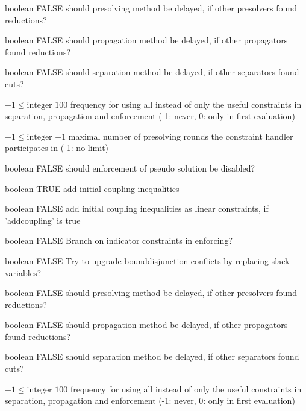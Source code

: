 %
{boolean}%
{FALSE}%
{should presolving method be delayed, if other presolvers found reductions?}%
{}

%
{boolean}%
{FALSE}%
{should propagation method be delayed, if other propagators found reductions?}%
{}

%
{boolean}%
{FALSE}%
{should separation method be delayed, if other separators found cuts?}%
{}

%
{$-1\leq\textrm{integer}$}%
{$100$}%
{frequency for using all instead of only the useful constraints in separation, propagation and enforcement (-1: never, 0: only in first evaluation)}%
{}

%
{$-1\leq\textrm{integer}$}%
{$-1$}%
{maximal number of presolving rounds the constraint handler participates in (-1: no limit)}%
{}

%
{boolean}%
{FALSE}%
{should enforcement of pseudo solution be disabled?}%
{}

%
{boolean}%
{TRUE}%
{add initial coupling inequalities}%
{}

%
{boolean}%
{FALSE}%
{add initial coupling inequalities as linear constraints, if 'addcoupling' is true}%
{}

%
{boolean}%
{FALSE}%
{Branch on indicator constraints in enforcing?}%
{}

%
{boolean}%
{FALSE}%
{Try to upgrade bounddisjunction conflicts by replacing slack variables?}%
{}

%
{boolean}%
{FALSE}%
{should presolving method be delayed, if other presolvers found reductions?}%
{}

%
{boolean}%
{FALSE}%
{should propagation method be delayed, if other propagators found reductions?}%
{}

%
{boolean}%
{FALSE}%
{should separation method be delayed, if other separators found cuts?}%
{}

%
{$-1\leq\textrm{integer}$}%
{$100$}%
{frequency for using all instead of only the useful constraints in separation, propagation and enforcement (-1: never, 0: only in first evaluation)}%
{}

